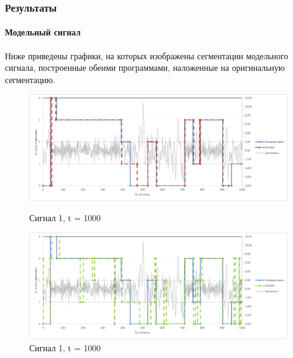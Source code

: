 \documentclass[9pt]{beamer}
\begin{document}
\begin{frame}\frametitle{Результаты}
\framesubtitle{Модельный сигнал}
Ниже приведены графики, на которых изображены сегментации модельного сигнала, построенные обеими программами, наложенные на оригинальную сегментацию.\\
\begin{figure}[h]
\begin{minipage}[h]{0.49\linewidth}
\includegraphics[width=\linewidth]{1k_burobin}
\caption{Сигнал 1, t = 1000}
\end{minipage}
\begin{minipage}[h]{0.49\linewidth}
\includegraphics[width=\linewidth]{1k_cusum}
\caption{Сигнал 1, t = 1000}
\end{minipage}
\end{figure}
\end{frame}
\end{document}
